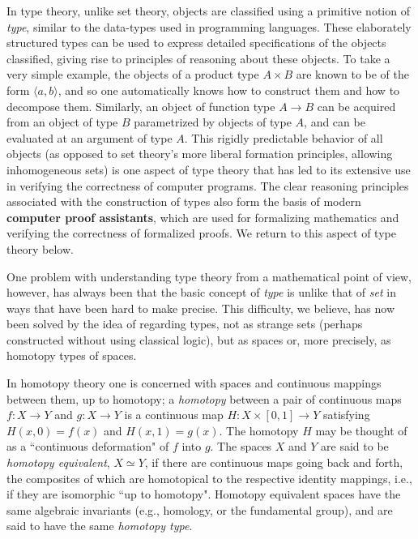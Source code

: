 {%

In type theory, unlike set theory, objects are classified using a primitive notion of \emph{type}, similar to the data-types used in programming languages.  These elaborately structured types can be used to express detailed specifications of the objects classified, giving rise to principles of reasoning about these objects.  To take a very simple example, the objects of a product type $A\times B$ are known to be of the form $\langle a, b\rangle$, and so one automatically knows how to construct them and how to decompose them. Similarly, an object of function type $A\to B$ can be acquired from an object of type $B$ parametrized by objects of type $A$, and can be evaluated at an argument of type $A$.  This rigidly predictable behavior of all objects (as opposed to set theory's more liberal formation principles, allowing inhomogeneous sets) is one aspect of type theory that has led to its extensive use in verifying the correctness of computer programs.  The clear reasoning principles associated with the construction of types also form the basis of modern {\bf computer proof assistants}, which are used for formalizing mathematics and verifying the correctness of formalized proofs.  We return to this aspect of type theory below.  



One problem with understanding type theory from a mathematical point of view, however, has always been that the basic concept of \emph{type} is unlike that of \emph{set} in ways that have been hard to make precise. This difficulty, we believe, has now been solved by the idea of regarding types, not as strange sets (perhaps constructed without using classical logic), but as spaces or, more precisely, as homotopy types of spaces.

In homotopy theory one is concerned with spaces and continuous mappings between them, 
up to homotopy; a \emph{homotopy} between a pair of continuous maps $f \colon X	\to Y$
and  $g \colon X	\to Y$ is 
a continuous map $H \colon X \times [0, 1]	\to Y$ satisfying
$H(x, 0) = f (x)$  and $H(x, 1) = g(x)$. The homotopy $H$ may be thought of as a ``continuous deformation" of $f$ into $g$. The spaces $X$ and $Y$ are said to be \emph{homotopy equivalent}, $X\simeq Y$, if there are continuous maps going back and forth, the composites of which are homotopical to the respective identity mappings, i.e., if they are isomorphic ``up to homotopy".  Homotopy equivalent spaces have the same algebraic invariants (e.g., homology, or the fundamental group), and are said to have the same \emph{homotopy type}.

}
